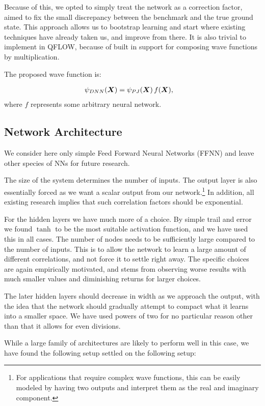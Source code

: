 \documentclass[Thesis.tex]{subfiles}
\begin{document}
Because of this, we opted to simply treat the network as a correction factor,
aimed to fix the small discrepancy between the benchmark and the true ground
state. This approach allows us to bootstrap learning and start where existing
techniques have already taken us, and improve from there. It is also trivial to
implement in QFLOW, because of built in support for composing wave functions by
multiplication.

The proposed wave function is:

\begin{align}\label{eq:pade-dnn}
  \psi_{DNN}(\bm{X}) &= \psi_{PJ}(\bm{X})\, f(\bm{X}),
\end{align}
where $f$ represents some arbitrary neural network.


\subsection{Network Architecture}

We consider here only simple Feed Forward Neural Networks (FFNN) and leave other
species of NNs for future research.

The size of the system determines the number of inputs.
The output layer is also essentially forced as we want a
scalar output from our network.\footnote{For applications that require complex
  wave functions, this can be easily modeled by having two outputs and
  interpret them as the real and imaginary component.} In addition, all
existing research implies that such correlation factors should be exponential.

For the hidden layers we have much more of a choice. By simple trail and error
we found $\tanh$ to be the most suitable activation function, and we have used this
in all cases. The number of nodes needs to be sufficiently large compared to the
number of inputs. This is to allow the network to learn a large amount of
different correlations, and not force it to settle right away.
The specific choices are again empirically motivated, and stems
from observing worse results with much smaller values and diminishing returns
for larger choices.

The later hidden layers should decrease in width as we approach the output, with
the idea that the network should gradually attempt to compact what it learns
into a smaller space. We have used powers of two for no particular reason other
than that it allows for even divisions.

While a large family of architectures are likely to perform well in this case,
we have found the following setup settled on the following setup:
\end{document}
